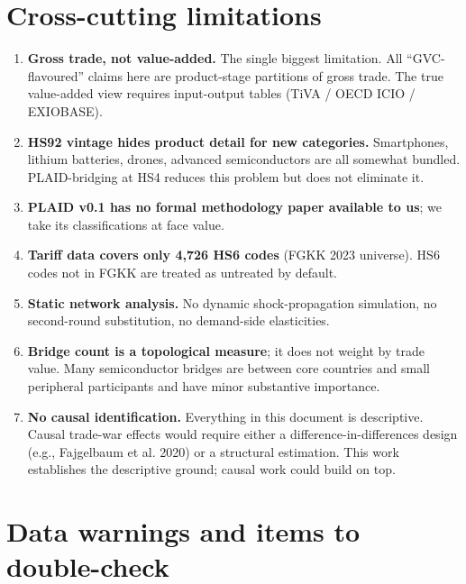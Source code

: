 \documentclass[11pt,a4paper]{article}
\begin{document}
\section{Cross-cutting limitations}

\begin{enumerate}[leftmargin=*]
  \item \textbf{Gross trade, not value-added.} The single biggest
        limitation. All ``GVC-flavoured'' claims here are
        product-stage partitions of gross trade. The true value-added
        view requires input-output tables (TiVA / OECD ICIO / EXIOBASE).
  \item \textbf{HS92 vintage hides product detail for new categories.}
        Smartphones, lithium batteries, drones, advanced semiconductors
        are all somewhat bundled. PLAID-bridging at HS4 reduces this
        problem but does not eliminate it.
  \item \textbf{PLAID v0.1 has no formal methodology paper available
        to us}; we take its classifications at face value.
  \item \textbf{Tariff data covers only 4{,}726 HS6 codes} (FGKK 2023
        universe). HS6 codes not in FGKK are treated as untreated by
        default.
  \item \textbf{Static network analysis.} No dynamic shock-propagation
        simulation, no second-round substitution, no demand-side elasticities.
  \item \textbf{Bridge count is a topological measure}; it does not weight
        by trade value. Many semiconductor bridges are between core
        countries and small peripheral participants and have minor
        substantive importance.
  \item \textbf{No causal identification.} Everything in this document is
        descriptive. Causal trade-war effects would require either
        a difference-in-differences design (e.g., Fajgelbaum et al. 2020)
        or a structural estimation. This work establishes the
        descriptive ground; causal work could build on top.
\end{enumerate}

\section{Data warnings and items to double-check}
\label{sec:warnings}
\end{document}
